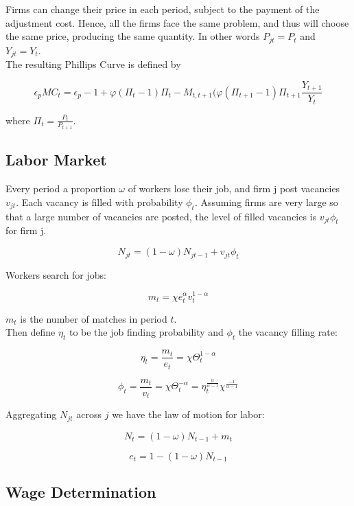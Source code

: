 \documentclass[titlepage]{\econtex}\providecommand{\texname}{Dissertation-Proposal}
\begin{document}
Firms can change their price in each period, subject to the payment of the adjustment cost.
Hence, all the firms face the same problem, and thus will choose the same price, producing the same quantity. In other words $P_{jt} =P_{t}$ and $Y_{jt} =Y_{t}$.\\ 

The resulting Phillips Curve is defined by


$$ \epsilon_{p} MC_{t} = \epsilon_{p} - 1 + \varphi ( \Pi_{t} -1) \Pi_{t} - M_{t,t+1} ( \varphi (\Pi_{t+1} -1 ) \Pi_{t+1} \frac{Y_{t+1}}{Y_{t}}$$

where $ \Pi_{t} = \frac{P_{t}}{P_{t+1}}$.



\hypertarget{Labor Market}{}
\subsection{Labor Market}

Every period a proportion $\omega$ of workers lose their job, and firm j post vacancies $v_{jt}$. Each vacancy is filled with probability $\phi_{t}$. Assuming firms are very large so that a large number of vacancies are posted, the level of filled vacancies is $v_{jt}\phi_{t}$ for firm j.

$$ N_{jt} = (1-\omega)N_{jt-1} + v_{jt} \phi_{t}$$

Workers search for jobs:

$$m_{t} = \chi e_{t}^{\alpha} v_{t}^{1-\alpha}$$

$m_{t}$ is the number of matches in period $t$.\\

Then define $\eta_{t}$ to be the job finding probability and $\phi_{t}$ the vacancy filling rate:

$$ \eta_{t} = \frac{m_{t}}{e_{t}} = \chi \Theta_{t}^{1-\alpha}$$

$$ \phi_{t} = \frac{m_{t}}{v_{t}} = \chi \Theta_{t}^{-\alpha} = \eta_{t}^{\frac{\alpha}{\alpha -1}} \chi^{\frac{-1}{\alpha - 1}}$$

Aggregating $N_{jt}$ across $j$ we have the law of motion for labor:

$$ N_{t} =  (1-\omega)N_{t-1} + m_{t} $$

$$ e_{t} = 1 - (1-\omega) N_{t-1} $$


\hypertarget{Wage Determination}{}
\subsection{Wage Determination }
\end{document}
